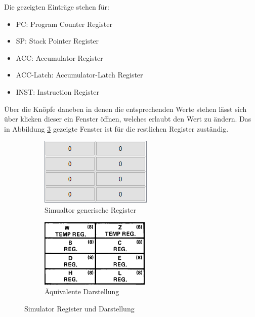 \documentclass[12pt]{article}
\newcommand{\imgSpaceBefore}{\vspace{10pt}}
\begin{document}
\noindent
Die gezeigten Einträge stehen für:\imgSpaceBefore

\begin{itemize}
	\item PC: Program Counter Register
	\item SP: Stack Pointer Register
	\item ACC: Accumulator Register
	\item ACC-Latch: Accumulator-Latch Register
	\item INST: Instruction Register
\end{itemize}

\noindent
Über die Knöpfe daneben in denen die entsprechenden Werte stehen lässt sich über klicken dieser ein Fenster öffnen, welches erlaubt den Wert zu ändern.
Das in Abbildung \ref{fig:GenReg} gezeigte Fenster ist für die restlichen Register zuständig.\imgSpaceBefore

\begin{figure}[h]
\centering
\begin{subfigure}{.5\textwidth}
  \centering
  \includegraphics[width=.7\linewidth]{bilder/GenericRegister_sim}
  \caption{Simualtor generische Register}
  \label{fig:GenReg_s}
\end{subfigure}%
\begin{subfigure}{.5\textwidth}
  \centering
  \includegraphics[width=.7\linewidth]{bilder/GenericRegister_pic}
  \caption{Äquivalente Darstellung}
  \label{fig:GenReg_p}
\end{subfigure}
\caption{Simulator Register und Darstellung}
\label{fig:GenReg}
\end{figure}
\end{document}
